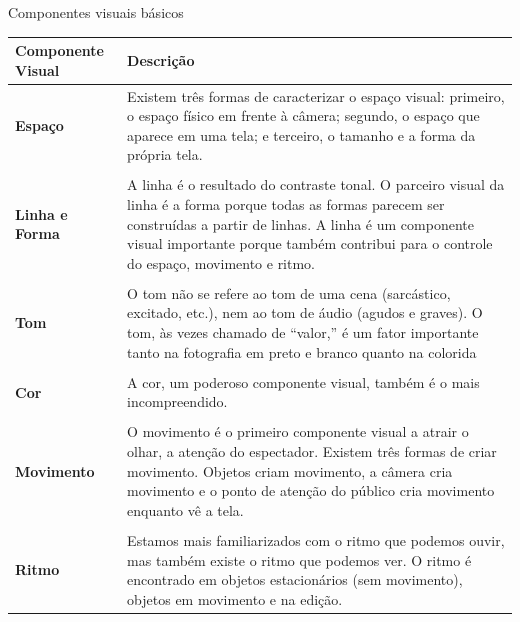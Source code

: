 \begin{quadro}
	\centering

	\caption{Componentes visuais básicos}
	\begin{tabular}{m{.2\linewidth}m{.7\linewidth}}
		\toprule
		\centering\textbf{Componente Visual} & \centering\textbf{Descrição} \tabularnewline
		\midrule
		\textbf{Espaço}                      & Existem três formas de caracterizar o espaço visual:
		primeiro, o espaço físico em frente à câmera; segundo, o espaço que
		aparece em uma tela; e terceiro, o tamanho e a forma da própria
		tela.\tabularnewline
		                                     & \tabularnewline
		\textbf{Linha e Forma}               & A linha é o resultado do contraste tonal. O
		parceiro visual da linha é a forma porque todas as formas parecem ser
		construídas a partir de linhas. A linha é um componente visual
		importante porque também contribui para o controle do espaço, movimento
		e ritmo.\tabularnewline
		                                     & \tabularnewline
		\textbf{Tom}                         & O tom não se refere ao tom de uma cena (sarcástico,
		excitado, etc.), nem ao tom de áudio (agudos e graves). O tom, às vezes
		chamado de \enquote{valor,} é um fator importante tanto na fotografia em preto e
		branco quanto na colorida\tabularnewline
		                                     & \tabularnewline
		\textbf{Cor}                         & A cor, um poderoso componente visual, também é o mais
		incompreendido.\tabularnewline
		                                     & \tabularnewline
		\textbf{Movimento}                   & O movimento é o primeiro componente visual a atrair
		o olhar, a atenção do espectador. Existem três formas de criar
		movimento. Objetos criam movimento, a câmera cria movimento e o ponto de
		atenção do público cria movimento enquanto vê a tela.\tabularnewline
		                                     & \tabularnewline
		\textbf{Ritmo}                       & Estamos mais familiarizados com o ritmo que podemos
		ouvir, mas também existe o ritmo que podemos ver. O ritmo é encontrado
		em objetos estacionários (sem movimento), objetos em movimento e na
		edição.\tabularnewline
		\bottomrule
	\end{tabular}
\end{quadro}


